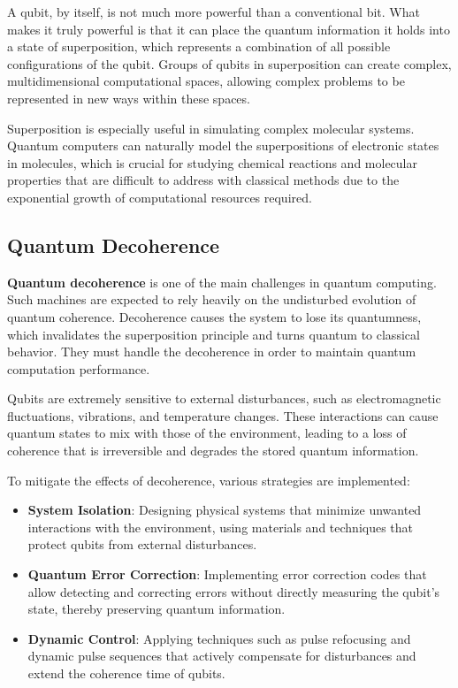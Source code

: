 A qubit, by itself, is not much more powerful than a conventional bit. What makes it truly powerful is that it can place the quantum information it holds into a state of superposition, which represents a combination of all possible configurations of the qubit. Groups of qubits in superposition can create complex, multidimensional computational spaces, allowing complex problems to be represented in new ways within these spaces.\cite{ibm_quantum_computing}

Superposition is especially useful in simulating complex molecular systems. Quantum computers can naturally model the superpositions of electronic states in molecules, which is crucial for studying chemical reactions and molecular properties that are difficult to address with classical methods due to the exponential growth of computational resources required.

\subsection{Quantum Decoherence}

\textbf{Quantum decoherence} is one of the main challenges in quantum computing. Such machines are expected to rely heavily on the undisturbed evolution of quantum coherence. Decoherence causes the system to lose its quantumness, which invalidates the superposition principle and turns quantum to classical behavior. They must handle the decoherence in order to maintain quantum computation performance.\cite{optimizing_decoherence}

Qubits are extremely sensitive to external disturbances, such as electromagnetic fluctuations, vibrations, and temperature changes. These interactions can cause quantum states to mix with those of the environment, leading to a loss of coherence that is irreversible and degrades the stored quantum information.\cite{decoherence}

To mitigate the effects of decoherence, various strategies are implemented:

\begin{itemize}
    \item \textbf{System Isolation}: Designing physical systems that minimize unwanted interactions with the environment, using materials and techniques that protect qubits from external disturbances.
    \item \textbf{Quantum Error Correction}: Implementing error correction codes that allow detecting and correcting errors without directly measuring the qubit's state, thereby preserving quantum information.
    \item \textbf{Dynamic Control}: Applying techniques such as pulse refocusing and dynamic pulse sequences that actively compensate for disturbances and extend the coherence time of qubits.
\end{itemize}

